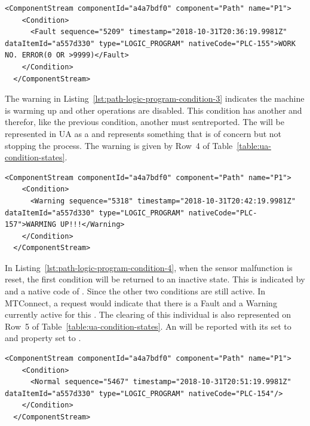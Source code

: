 \begin{lstlisting}[firstnumber=last,escapechar=|,%
    caption={Path Logic Program Second Fault PLC-155},label={lst:path-logic-program-condition-2}]
  <ComponentStream componentId="a4a7bdf0" component="Path" name="P1">
    <Condition>
      <Fault sequence="5209" timestamp="2018-10-31T20:36:19.9981Z" dataItemId="a557d330" type="LOGIC_PROGRAM" nativeCode="PLC-155">WORK NO. ERROR(0 OR >9999)</Fault>
    </Condition>
  </ComponentStream>
\end{lstlisting}

The warning in Listing~\ref{lst:path-logic-program-condition-3} indicates the machine is warming up and other operations are disabled. This condition has another  and therefor, like the previous condition, another  must sentreported. The  will be represented in UA as a  and represents something that is of concern but not stopping the process. The warning is given by Row~4 of Table~\ref{table:ua-condition-states}.

\begin{lstlisting}[firstnumber=last,escapechar=|,%
    caption={Path Logic Program Warning PLC-157},label={lst:path-logic-program-condition-3}]
  <ComponentStream componentId="a4a7bdf0" component="Path" name="P1">
    <Condition>
      <Warning sequence="5318" timestamp="2018-10-31T20:42:19.9981Z" dataItemId="a557d330" type="LOGIC_PROGRAM" nativeCode="PLC-157">WARMING UP!!!</Warning>
    </Condition>
  </ComponentStream>
\end{lstlisting}

In Listing~\ref{lst:path-logic-program-condition-4}, when the sensor malfunction is reset, the first condition will be returned to an inactive state. This is indicated by  and a native code of . Since the other two conditions are still active. In MTConnect, a  request would indicate that there is a Fault and a Warning currently active for this . The clearing of this individual  is also represented on Row~5 of Table~\ref{table:ua-condition-states}. An   will be reported with its  set to  and  property set to .

\begin{lstlisting}[firstnumber=last,escapechar=|,%
    caption={Path Logic Program Clear Fault of PLC-154},label={lst:path-logic-program-condition-4}]
  <ComponentStream componentId="a4a7bdf0" component="Path" name="P1">
    <Condition>
      <Normal sequence="5467" timestamp="2018-10-31T20:51:19.9981Z" dataItemId="a557d330" type="LOGIC_PROGRAM" nativeCode="PLC-154"/>
    </Condition>
  </ComponentStream>
\end{lstlisting}

